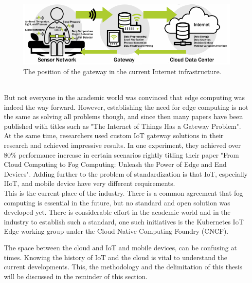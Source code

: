 { \begin{figure}[!h]
     \centering
     \includegraphics[scale=2]{figures/iotSetup.png}
     \caption{The position of the gateway in the current Internet infrastructure\cite{iotGatewaySlavesGraph}.}
     \label{fig:iotDeviceSetup}
 \end{figure}\\
But not everyone in the academic world was convinced that edge computing was indeed the way forward. 
However, establishing the need for edge computing is not the same as solving all problems though, and since then many papers have been published with titles such as "The Internet of Things Has a Gateway Problem"\cite{zachariah2015internetOfThingsHasGatewayProblem}. At the same time, researchers used custom IoT gateway solutions in their research and achieved impressive results. In one experiment, they achieved over 80\% performance increase in certain scenarios rightly titling their paper "From Cloud Computing to Fog Computing: Unleash the Power of Edge and End Devices"\cite{hong2017fromCloudtoIoTGatewayUnleashingTHePower}. Adding further to the problem of standardization is that IoT, especially IIoT, and mobile device have very different requirements.\\
This is the current place of the industry. There is a common agreement that fog computing is essential in the future, but no standard and open solution was developed yet. There is considerable effort in the academic world and in the industry to establish such a standard, one such initiatives is the Kubernetes IoT Edge working group under the Cloud Native Computing Foundry (CNCF). 




The space between the cloud and IoT and mobile devices, can be confusing at times. Knowing the history of IoT and the cloud is vital to understand the current developments. This, the methodology and the delimitation of this thesis will be discussed in the reminder of this section.\\




}
